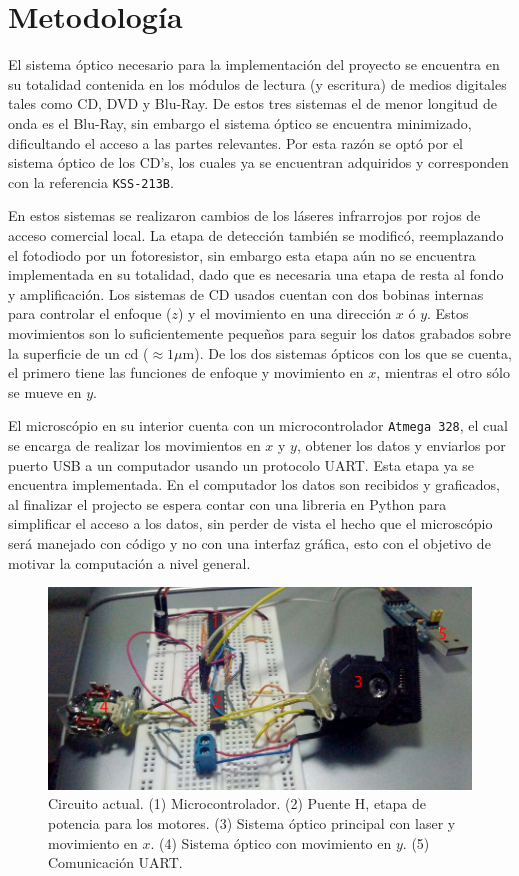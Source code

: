 \documentclass[11pt]{article}
\begin{document}
	\section{Metodolog\'ia}
		El sistema \'optico necesario para la implementaci\'on del proyecto se encuentra en su totalidad contenida en los m\'odulos de lectura (y escritura) de medios digitales tales como CD, DVD y Blu-Ray. De estos tres sistemas el de menor longitud de onda es el Blu-Ray, sin embargo el sistema \'optico se encuentra minimizado, dificultando el acceso a las partes relevantes. Por esta raz\'on se opt\'o por el sistema \'optico de los CD's, los cuales ya se encuentran adquiridos y corresponden con la referencia \texttt{KSS-213B}.
		
		En estos sistemas se realizaron cambios de los l\'aseres infrarrojos por rojos de acceso comercial local. La etapa de detecci\'on tambi\'en se modific\'o, reemplazando el fotodiodo por un fotoresistor, sin embargo esta etapa aún no se encuentra implementada en su totalidad, dado que es necesaria una etapa de resta al fondo y amplificaci\'on. Los sistemas de CD usados cuentan con dos bobinas internas para controlar el enfoque ($z$) y el movimiento en una direcci\'on $x$ \'o $y$. Estos movimientos son lo suficientemente peque\~nos para seguir los datos grabados sobre la superficie de un cd ($\approx 1\mu$m). De los dos sistemas \'opticos con los que se cuenta, el primero tiene las funciones de enfoque y movimiento en $x$, mientras el otro s\'olo se mueve en $y$.
		
		El microsc\'opio en su interior cuenta con un microcontrolador \texttt{Atmega 328}, el cual se encarga de realizar los movimientos en $x$ y $y$, obtener los datos y enviarlos por puerto USB a un computador usando un protocolo UART. Esta etapa ya se encuentra implementada. En el computador los datos son recibidos y graficados, al finalizar el projecto se espera contar con una libreria en Python para simplificar el acceso a los datos, sin perder de vista el hecho que el microsc\'opio ser\'a manejado con c\'odigo y no con una interfaz gr\'afica, esto con el objetivo de motivar la computaci\'on a nivel general.
		
		\begin{figure}[h]
			\centering
			\includegraphics[width=0.7\linewidth]{breadboard.jpg}
			\caption{Circuito actual. (1) Microcontrolador. (2) Puente H, etapa de potencia para los motores. (3) Sistema \'optico principal con laser y movimiento en $x$. (4) Sistema \'optico con movimiento en $y$. (5) Comunicaci\'on UART.}
		\end{figure}
	
\end{document}

